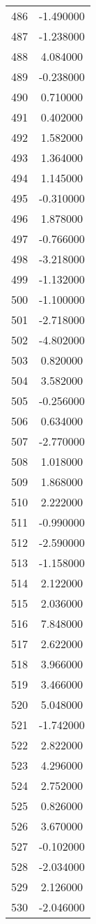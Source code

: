 \documentclass[12pt]{article}
\begin{document}
\begin{longtable}{@{}cc@{}}
486 & -1.490000 \\
487 & -1.238000 \\
488 & 4.084000 \\
489 & -0.238000 \\
490 & 0.710000 \\
491 & 0.402000 \\
492 & 1.582000 \\
493 & 1.364000 \\
494 & 1.145000 \\
495 & -0.310000 \\
496 & 1.878000 \\
497 & -0.766000 \\
498 & -3.218000 \\
499 & -1.132000 \\
500 & -1.100000 \\
501 & -2.718000 \\
502 & -4.802000 \\
503 & 0.820000 \\
504 & 3.582000 \\
505 & -0.256000 \\
506 & 0.634000 \\
507 & -2.770000 \\
508 & 1.018000 \\
509 & 1.868000 \\
510 & 2.222000 \\
511 & -0.990000 \\
512 & -2.590000 \\
513 & -1.158000 \\
514 & 2.122000 \\
515 & 2.036000 \\
516 & 7.848000 \\
517 & 2.622000 \\
518 & 3.966000 \\
519 & 3.466000 \\
520 & 5.048000 \\
521 & -1.742000 \\
522 & 2.822000 \\
523 & 4.296000 \\
524 & 2.752000 \\
525 & 0.826000 \\
526 & 3.670000 \\
527 & -0.102000 \\
528 & -2.034000 \\
529 & 2.126000 \\
530 & -2.046000 \\

\end{longtable}
\end{document}

